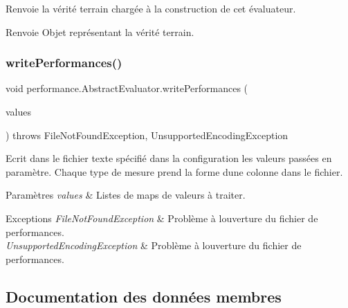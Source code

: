 Renvoie la vérité terrain chargée à la construction de cet évaluateur.

\begin{DoxyReturn}{Renvoie}
Objet représentant la vérité terrain. 
\end{DoxyReturn}
\mbox{\label{classperformance_1_1AbstractEvaluator_ace1f5ce554bea51a7fccc5308ac41ac9}} 
\subsubsection{\texorpdfstring{write\+Performances()}{writePerformances()}}
{\footnotesize\ttfamily void performance.\+Abstract\+Evaluator.\+write\+Performances (\begin{DoxyParamCaption}\item[{List$<$ Map$<$ \hyperlink{enumperformance_1_1AbstractEvaluator_1_1MeasureName}{Measure\+Name}, Float $>$$>$}]{values }\end{DoxyParamCaption}) throws File\+Not\+Found\+Exception, Unsupported\+Encoding\+Exception\hspace{0.3cm}{\ttfamily [protected]}}

Ecrit dans le fichier texte spécifié dans la configuration les valeurs passées en paramètre. Chaque type de mesure prend la forme d\textquotesingle{}une colonne dans le fichier.


\begin{DoxyParams}{Paramètres}
{\em values} & Listes de maps de valeurs à traiter. \\
\hline
\end{DoxyParams}

\begin{DoxyExceptions}{Exceptions}
{\em File\+Not\+Found\+Exception} & Problème à l\textquotesingle{}ouverture du fichier de performances. \\
\hline
{\em Unsupported\+Encoding\+Exception} & Problème à l\textquotesingle{}ouverture du fichier de performances. \\
\hline
\end{DoxyExceptions}


\subsection{Documentation des données membres}
\mbox{\label{classperformance_1_1AbstractEvaluator_a75eb2b45c3b578fe523ca79f9e31e7e2}} 
